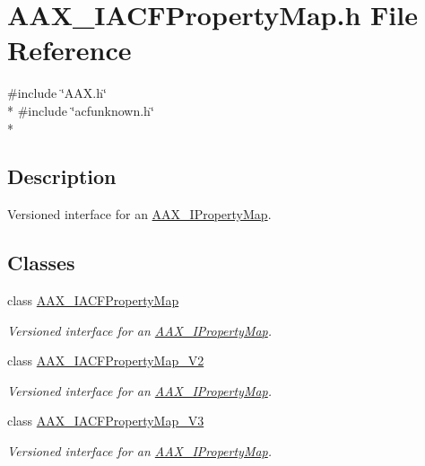 \hypertarget{a00232}{}\section{A\+A\+X\+\_\+\+I\+A\+C\+F\+Property\+Map.\+h File Reference}
\label{a00232}
{\ttfamily \#include \char`\"{}A\+A\+X.\+h\char`\"{}}\\*
{\ttfamily \#include \char`\"{}acfunknown.\+h\char`\"{}}\\*


\subsection{Description}
Versioned interface for an \hyperlink{a00112}{A\+A\+X\+\_\+\+I\+Property\+Map}. 

\subsection*{Classes}
\begin{DoxyCompactItemize}
\item 
class \hyperlink{a00079}{A\+A\+X\+\_\+\+I\+A\+C\+F\+Property\+Map}
\begin{DoxyCompactList}\small\item\em Versioned interface for an \hyperlink{a00112}{A\+A\+X\+\_\+\+I\+Property\+Map}. \end{DoxyCompactList}\item 
class \hyperlink{a00080}{A\+A\+X\+\_\+\+I\+A\+C\+F\+Property\+Map\+\_\+\+V2}
\begin{DoxyCompactList}\small\item\em Versioned interface for an \hyperlink{a00112}{A\+A\+X\+\_\+\+I\+Property\+Map}. \end{DoxyCompactList}\item 
class \hyperlink{a00081}{A\+A\+X\+\_\+\+I\+A\+C\+F\+Property\+Map\+\_\+\+V3}
\begin{DoxyCompactList}\small\item\em Versioned interface for an \hyperlink{a00112}{A\+A\+X\+\_\+\+I\+Property\+Map}. \end{DoxyCompactList}\end{DoxyCompactItemize}

